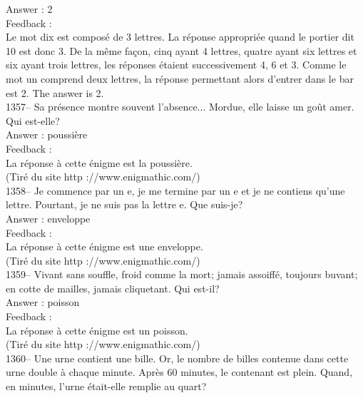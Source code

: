 ﻿\documentclass[letterpaper, 12pt]{article}
\begin{document}
Answer : 2\\

Feedback : \\
Le mot dix est compos\'e de 3 lettres. La r\'eponse appropri\'ee
quand le portier dit 10 est donc 3. De la m\^eme fa\c con, cinq
ayant 4 lettres, quatre ayant six lettres et six ayant trois
lettres, les r\'eponses \'etaient successivement 4, 6 et 3. Comme le
mot un comprend deux lettres, la r\'eponse permettant alors d'entrer
dans le bar est 2.
The answer is 2.\\

1357--  Sa pr\'esence montre souvent l'absence... Mordue, elle laisse un
go\^ut amer.  Qui est-elle?\\

Answer : poussi\`ere\\

Feedback : \\
La r\'eponse \`a cette \'enigme est la poussi\`ere.\\
(Tir\'e du site http ://www.enigmathic.com/)\\

1358-- Je commence par un e, je me termine par un e et je ne contiens qu'une
lettre.  Pourtant, je ne suis pas la lettre e. Que suis-je?\\

Answer : enveloppe\\

Feedback : \\
La r\'eponse \`a cette \'enigme est une enveloppe.\\
(Tir\'e du site http ://www.enigmathic.com/)\\

1359-- Vivant sans souffle, froid comme la mort; jamais assoiff\'e, toujours
buvant; en cotte de mailles, jamais cliquetant. Qui est-il?\\

Answer : poisson\\

Feedback :\\
La r\'eponse \`a cette \'enigme est un poisson.\\
(Tir\'e du site http ://www.enigmathic.com/)\\

1360--  Une urne contient une bille.  Or, le nombre de billes contenue dans
cette urne double \`a chaque minute. Apr\`es 60 minutes, le contenant est
plein.  Quand, en minutes, l'urne \'etait-elle remplie au quart?\\
\end{document}
